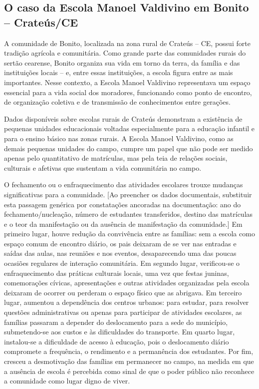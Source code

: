 \documentclass[
  12pt,
  openright,
  twoside,
  a4paper,
  english,
  brazilian,
  sumario=tradicional
]{abntex2}
\begin{document}
\subsection{O caso da Escola Manoel Valdivino em Bonito -- Crateús/CE}
A comunidade de Bonito, localizada na zona rural de Crateús -- CE, possui forte tradição agrícola e comunitária. Como grande parte das comunidades rurais do sertão cearense, Bonito organiza sua vida em torno da terra, da família e das instituições locais -- e, entre essas instituições, a escola figura entre as mais importantes. Nesse contexto, a Escola Manoel Valdivino representava um espaço essencial para a vida social dos moradores, funcionando como ponto de encontro, de organização coletiva e de transmissão de conhecimentos entre gerações.

Dados disponíveis sobre escolas rurais de Crateús demonstram a existência de pequenas unidades educacionais voltadas especialmente para a educação infantil e para o ensino básico nas zonas rurais. A Escola Manoel Valdivino, como as demais pequenas unidades do campo, cumpre um papel que não pode ser medido apenas pelo quantitativo de matrículas, mas pela teia de relações sociais, culturais e afetivas que sustentam a vida comunitária no campo.

O fechamento ou o enfraquecimento das atividades escolares trouxe mudanças significativas para a comunidade. [Ao preencher os dados documentais, substituir esta passagem genérica por constatações ancoradas na documentação: ano do fechamento/nucleação, número de estudantes transferidos, destino das matrículas e o teor da manifestação ou da ausência de manifestação da comunidade.] Em primeiro lugar, houve redução da convivência entre as famílias: sem a escola como espaço comum de encontro diário, os pais deixaram de se ver nas entradas e saídas das aulas, nas reuniões e nos eventos, desaparecendo uma das poucas ocasiões regulares de interação comunitária. Em segundo lugar, verificou-se o enfraquecimento das práticas culturais locais, uma vez que festas juninas, comemorações cívicas, apresentações e outras atividades organizadas pela escola deixaram de ocorrer ou perderam o espaço físico que as abrigava. Em terceiro lugar, aumentou a dependência dos centros urbanos: para estudar, para resolver questões administrativas ou apenas para participar de atividades escolares, as famílias passaram a depender do deslocamento para a sede do município, submetendo-se aos custos e às dificuldades do transporte. Em quarto lugar, instalou-se a dificuldade de acesso à educação, pois o deslocamento diário compromete a frequência, o rendimento e a permanência dos estudantes. Por fim, cresceu a desmotivação das famílias em permanecer no campo, na medida em que a ausência de escola é percebida como sinal de que o poder público não reconhece a comunidade como lugar digno de viver.
\end{document}
